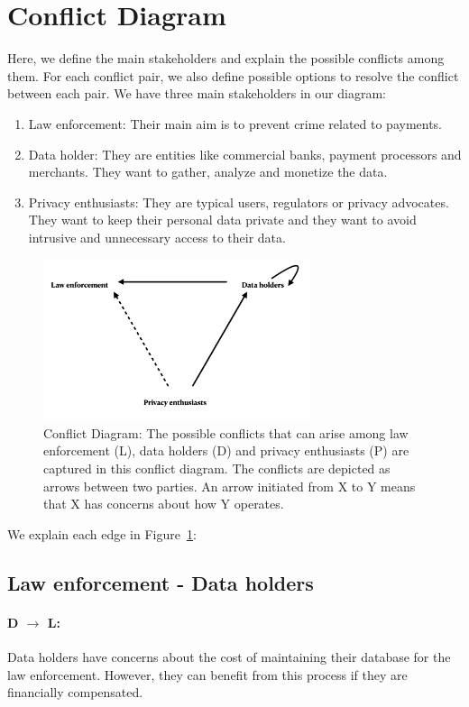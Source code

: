 \documentclass[runningheads]{llncs}
\begin{document}
\section{Conflict Diagram}
Here, we define the main stakeholders and explain the possible conflicts among them. For each conflict pair, we also define possible options to resolve the conflict between each pair. We have three main stakeholders in our diagram:

\begin{enumerate}
	\item Law enforcement: Their main aim is to prevent crime related to payments.
	\item Data holder: They are entities like commercial banks, payment processors and merchants. They want to gather, analyze and monetize the data.
	\item Privacy enthusiasts: They are typical users, regulators or privacy advocates. They want to keep their personal data private and they want to avoid intrusive and unnecessary access to their data.
	 
\end{enumerate}


\begin{figure}[htb!]
	\includegraphics[width=0.7\textwidth]{figures/triangle.png}
	\caption{Conflict Diagram: The possible conflicts that can arise among law enforcement (L), data holders (D) and privacy enthusiasts (P) are captured in this conflict diagram. The conflicts are depicted as arrows between two parties. An arrow initiated from X to Y means that X has concerns about how Y operates. }
	\centering
	\label{fig:triangle}
\end{figure}

We explain each edge in Figure~\ref{fig:triangle}:
\subsection{Law enforcement - Data holders}
\paragraph{D $\rightarrow$ L:}
Data holders have concerns about the cost of maintaining their database for the law enforcement. However, they can benefit from this process if they are financially compensated.
\end{document}
